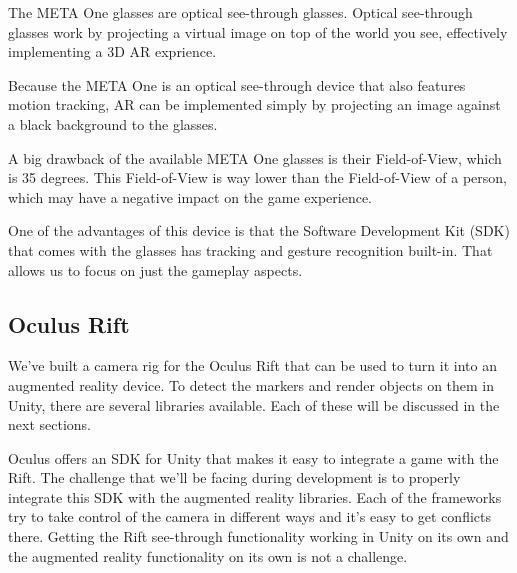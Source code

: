 			The META One glasses are optical see-through glasses. Optical
			see-through glasses work by projecting a virtual image on top of the
			world you see, effectively implementing a 3D AR exprience.

			Because the META One is an optical see-through device that also
			features motion tracking, AR can be implemented simply by
			projecting an image against a black background to the glasses.

			A big drawback of the available META One glasses is their
			Field-of-View, which is 35 degrees. This Field-of-View is way lower
			than the Field-of-View of a person, which may have a negative impact
			on the game experience.

			One of the advantages of this device is that the Software Development
			Kit (SDK) that comes with the glasses has tracking and gesture
			recognition built-in. That allows us to focus on just the gameplay
			aspects.

		\subsection{Oculus Rift} \label{ssec:oculusrift}
			We've built a camera rig for the Oculus Rift that can be used to
			turn it into an augmented reality device. To detect the markers and
			render objects on them in Unity, there are several libraries
			available. Each of these will be discussed in the next sections.

			Oculus offers an SDK for Unity that makes it easy to integrate a
			game with the Rift. The challenge that we'll be facing during
			development is to properly integrate this SDK with the augmented
			reality libraries. Each of the frameworks try to take control of the
			camera in different ways and it's easy to get conflicts there.
			Getting the Rift see-through functionality working in Unity on its
			own and the augmented reality functionality on its own is not a
			challenge.

